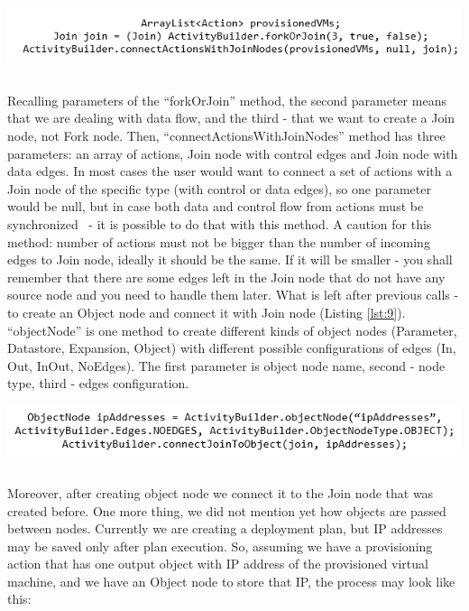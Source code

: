 \begin{center}
	\includegraphics[width=38em]{./Figures/Join}
	\begin{lstlisting}[mathescape,caption={Join node},label={lst:8}]
	\end{lstlisting}
\end{center} 

\noindent Recalling parameters of the ``forkOrJoin'' method, the second parameter means that we are dealing with data flow, and the third - that we want to create a Join node, not Fork node. Then, ``connectActionsWithJoinNodes'' method has three parameters: an array of actions, Join node with control edges and Join node with data edges. In most cases the user would want to connect a set of actions with a Join node of the specific type (with control or data edges), so one parameter would be null, but in case both data and control flow from actions must be synchronized ~- it is possible to do that with this method. A caution for this method: number of actions must not be bigger than the number of incoming edges to Join node, ideally it should be the same. If it will be smaller - you shall remember that there are some edges left in the Join node that do not have any source node and you need to handle them later. What is left after previous calls - to create an Object node and connect it with Join node (Listing \ref{lst:9}). ``objectNode'' is one method to create different kinds of object nodes (Parameter, Datastore, Expansion, Object) with different possible configurations of edges (In, Out, InOut, NoEdges). The first parameter is object node name, second - node type, third - edges configuration.

\begin{center}
	\includegraphics[width=38em]{./Figures/Object}
	\begin{lstlisting}[mathescape,caption={Object node},label={lst:9}]
	\end{lstlisting}
\end{center} 

\noindent Moreover, after creating object node we connect it to the Join node that was created before. One more thing, we did not mention yet how objects are passed between nodes. Currently we are creating a deployment plan, but IP addresses may be saved only after plan execution. So, assuming we have a provisioning action that has one output object with IP address of the provisioned virtual machine, and we have an Object node to store that IP, the process may look like this:

